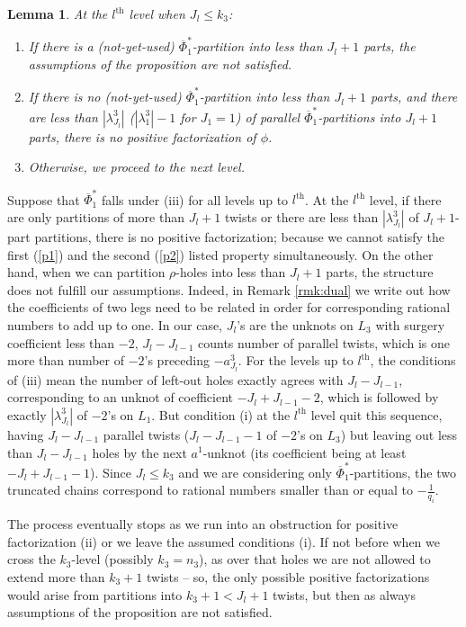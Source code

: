 \documentclass{amsart}
\newtheorem{lem}[thm]{Lemma}
\theoremstyle{definition}
\begin{document}
\begin{lem}\label{l4} At the $l^\text{th}$ level when $J_l\leq k_3$:
\begin{enumerate}[leftmargin=.7cm]
  \item[(i)] If there is a (not-yet-used) $\overline\Phi_1^*$-partition into less than $J_l+1$ parts, the assumptions of the proposition are not satisfied. 
  \item[(ii)] If there is no (not-yet-used) $\overline\Phi_1^*$-partition into less than $J_l+1$ parts, and there are less than $|\lambda_{J_l}^3|$ ($|\lambda_1^3|-1$ for $J_1=1$) of parallel $\overline\Phi_1^*$-partitions into $J_l+1$ parts, there is no positive factorization of $\phi$.
  \item[(iii)] Otherwise, we proceed to the next level.
\end{enumerate}
\end{lem}

\proof
Suppose that $\overline\Phi_1^*$ falls under (iii) for all levels up to $l^\text{th}$.  At the $l^\text{th}$ level, if there are only partitions of more than $J_l+1$ twists or there are less than $|\lambda_{J_l}^3|$ of $J_l+1$-part partitions, there is no positive factorization; because we cannot satisfy the first (\ref{p1}) and the second (\ref{p2}) listed property simultaneously. On the other hand, when we can partition $\rho$-holes into less than $J_l+1$ parts, the structure does not fulfill our assumptions. Indeed, in Remark \ref{rmk:dual} we write out how the coefficients of two legs need to be related in order for corresponding rational numbers to add up to one. In our case, $J_l$'s are the unknots on $L_3$ with surgery coefficient less than $-2$, $J_l-J_{l-1}$ counts number of parallel twists, which is one more than number of $-2$'s preceding $-a_{J_l}^3$. For the levels up to $l^\text{th}$, the conditions of (iii) mean the number of left-out holes exactly agrees with $J_l-J_{l-1}$, corresponding to an unknot of coefficient $-J_l+J_{l-1}-2$, which is followed by exactly $|\lambda_{J_l}^3|$ of $-2$'s on $L_1$. But condition (i) at the $l^\text{th}$ level quit this sequence, having $J_l-J_{l-1}$ parallel twists ($J_l-J_{l-1}-1$ of $-2$'s on $L_3$) but leaving out less than $J_l-J_{l-1}$ holes by the next $a^{1}$-unknot (its coefficient being at least $-J_l+J_{l-1}-1$). Since $J_l\leq k_3$ and we are considering only $\overline\Phi_1^*$-partitions, the two truncated chains correspond to rational numbers smaller than or equal to $-\frac{1}{q_i}$. 
\endproof

 The process eventually stops as we run into an obstruction for positive factorization (ii) or we leave the assumed conditions (i). If not before when we cross the $k_3$-level (possibly $k_3=n_3$), as over that holes we are not allowed to extend more than $k_3+1$ twists -- so, the only possible positive factorizations would arise from partitions into $k_3+1<J_l+1$ twists, but then as always assumptions of the proposition are not satisfied.
\endproof
\end{document}
